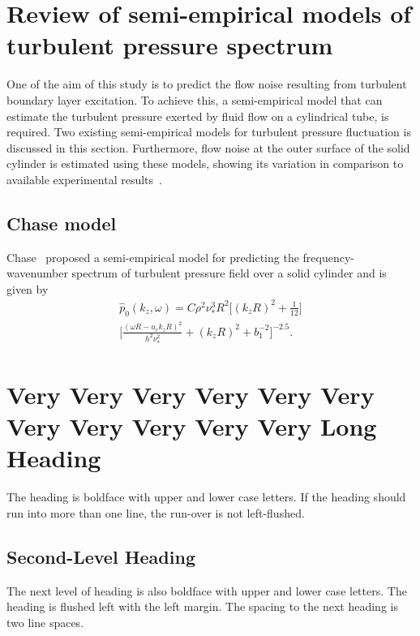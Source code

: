 \documentclass[twocolumn,10pt]{asme2ej}
\begin{document}
\section{Review of semi-empirical models of turbulent pressure spectrum} \label{sec:empmodels}
One of the aim of this study is to predict the flow noise resulting from turbulent boundary layer excitation. To achieve this, a semi-empirical model that can estimate the turbulent pressure exerted by fluid flow on a cylindrical tube, is required. Two existing semi-empirical models for turbulent pressure fluctuation is discussed in this section. Furthermore, flow noise at the outer surface of the solid cylinder is estimated using these models, showing its variation in comparison to available experimental results~\cite{Unni2011}. 

\subsection{Chase model}\label{Chase model}
Chase~\cite{Chase1981} proposed a semi-empirical model for predicting the frequency-wavenumber spectrum of turbulent pressure field over a solid cylinder and is given by
\begin{multline}
        \hat{p}_{0}(k_{z},\omega) = C\rho^{2}\nu_{*}^{3}R^2\biggl[(k_{z}R)^{2}+\frac{1}{12}\biggr]\\ \biggl[\frac{(\omega R-u_{c}k_{z}R)^{2}}{h^{2}\nu_{*}^{2}}+(k_{z}R)^{2}+b_1^{-2}\biggr]^{-2.5}.
		\label{Turbulent pressure spectrum equation Chase}
\end{multline}


\section{Very Very Very Very Very Very Very Very Very Very Very Long Heading}

The heading is boldface with upper and lower case letters. 
If the heading should run into more than one line, the run-over is not left-flushed.

\subsection{Second-Level Heading}

The next level of heading is also boldface with upper and lower case letters. 
The heading is flushed left with the left margin. The spacing to the next heading is two line spaces.
\end{document}
